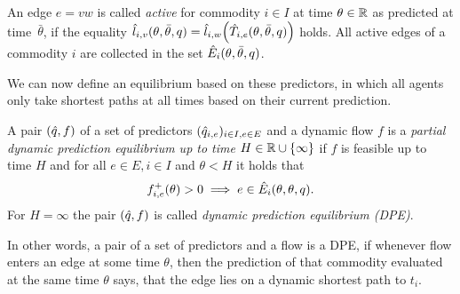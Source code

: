 An edge $e=vw$ is called \emph{active} for commodity $i\in I$ at time $\theta\in\mathbb{R}$ as predicted at time~$\bar\theta$, if the equality $\hat l_{i,v}(\theta, \bar\theta, q) = \hat l_{i,w}{\left(
        \hat T_{i, e}(\theta, \bar\theta, q)
    \right)}$ holds.
All active edges of a commodity $i$ are collected in the set $\hat E_i(\theta, \bar\theta, q)$. 

We can now define an equilibrium based on these predictors, in which all agents only take shortest paths at all times based on their current prediction.
\begin{definition}
    A pair $(\hat q, f)$ of a set of predictors $(\hat q_{i,e})_{i\in I, e\in E}$ and a dynamic flow $f$ is a \emph{partial dynamic prediction equilibrium up to time $H\in\mathbb{R}\cup\{\infty\}$} if $f$ is feasible up to time $H$ and for all $e\in E, i\in I$ and $\theta < H$ it holds that
    \[
        {f}^+_{i,e}(\theta) > 0 \implies e \in \hat E_i(\theta, \theta, q).
    \]
    For $H = \infty$ the pair $(\hat q, f)$ is called \emph{dynamic prediction equilibrium (DPE)}. 
\end{definition}

In other words, a pair of a set of predictors and a flow is a DPE, if whenever flow enters an edge at some time $\theta$, then the prediction of that commodity evaluated at the same time $\theta$ says, that the edge lies on a dynamic shortest path to $t_i$.

